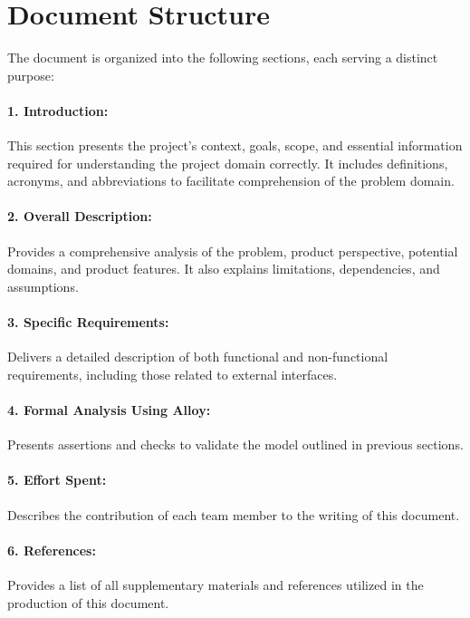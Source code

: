 \section{Document Structure}
\label{sec:document_structure}%
The document is organized into the following sections, each serving a distinct purpose:

\paragraph{1. Introduction:} This section presents the project's context, goals, scope, and essential information required for understanding the project domain correctly. It includes definitions, acronyms, and abbreviations to facilitate comprehension of the problem domain.

\paragraph{2. Overall Description:} Provides a comprehensive analysis of the problem, product perspective, potential domains, and product features. It also explains limitations, dependencies, and assumptions.

\paragraph{3. Specific Requirements:} Delivers a detailed description of both functional and non-functional requirements, including those related to external interfaces.

\paragraph{4. Formal Analysis Using Alloy:} Presents assertions and checks to validate the model outlined in previous sections.

\paragraph{5. Effort Spent:} Describes the contribution of each team member to the writing of this document.

\paragraph{6. References:} Provides a list of all supplementary materials and references utilized in the production of this document.

